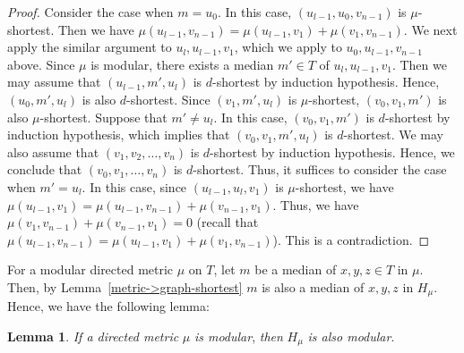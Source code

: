 \documentclass[11pt]{article}
\theoremstyle{definition}
\newtheorem{lemma}[theorem]{Lemma}
\begin{document}
\begin{proof}
Consider the case when $m=u_0$. In this case, $(u_{l-1},u_0,v_{n-1})$ is $\mu$-shortest. Then we have $\mu(u_{l-1},v_{n-1})=\mu(u_{l-1},v_1)+\mu(v_1,v_{n-1})$. 
We next apply the similar argument to $u_l,u_{l-1},v_1$, which we apply to $u_0,u_{l-1},v_{n-1}$ above. Since $\mu$ is modular, there exists a median $m'\in T$ of $u_l,u_{l-1},v_1$. Then we may assume that $(u_{l-1},m',u_l)$ is $d$-shortest by induction hypothesis. Hence, $(u_0,m',u_l)$ is also $d$-shortest. Since $(v_1,m',u_l)$ is $\mu$-shortest, $(v_0,v_1,m')$ is also $\mu$-shortest. Suppose that $m'\neq u_l$. In this case, $(v_0,v_1,m')$ is $d$-shortest by induction hypothesis, which implies that $(v_0,v_1,m',u_l)$ is $d$-shortest. We may also assume that $(v_1,v_2,\ldots,v_n)$ is $d$-shortest by induction hypothesis. Hence, we conclude that  $(v_0,v_1,\ldots,v_{n})$ is $d$-shortest. Thus, it suffices to consider the case when $m'=u_l$. In this case, since $(u_{l-1},u_l,v_1)$ is $\mu$-shortest, we have $\mu(u_{l-1},v_1)=\mu(u_{l-1},v_{n-1})+\mu(v_{n-1},v_1)$.  
Thus, we have $\mu(v_1,v_{n-1})+\mu(v_{n-1},v_1)=0$ (recall that $\mu(u_{l-1},v_{n-1})=\mu(u_{l-1},v_1)+\mu(v_1,v_{n-1})$). This is a contradiction.
\end{proof}

For a modular directed metric $\mu$ on $T$, let $m$ be a median of $x,y,z\in T$ in $\mu$. Then, by Lemma~\ref{metric->graph-shortest} $m$ is also a median of $x,y,z$ in $H_\mu$. Hence, we have the following lemma:
\begin{lemma}
\label{lemma:mu is modular -> H is modular}
\textit{If a directed metric} $\mu$ \textit{is modular}, \textit{then} $H_\mu$ \textit{is also modular}.
\end{lemma}
\end{document}

